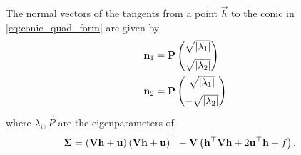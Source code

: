 \begin{theorem}
	The normal vectors of the tangents from 
	a point $\vec{h}$ to the conic in \eqref{eq:conic_quad_form}
	are given by 
  \begin{align} 
  \label{eq:quad_form_pair_normvecs-sigma}
  \begin{split}
  \mathbf{n}_1 &= \mathbf{P}\begin{pmatrix}\sqrt{\left\vert\lambda_1\right\vert} \\[2mm]  \sqrt{\left\vert\lambda_2\right\vert}\end{pmatrix}
  \\
  \mathbf{n}_2 &= \mathbf{P}\begin{pmatrix}\sqrt{\left\vert\lambda_1\right\vert} \\[2mm] - \sqrt{\left\vert\lambda_2\right\vert}\end{pmatrix}
  \end{split}
  \end{align} 
  where $\lambda_i, \vec{P}$ are the eigenparameters of 
  \begin{align} 
		\bm{\Sigma} &= 
	   \left(\mathbf{V}\mathbf{h}+\mathbf{u}\right)
	  \left(\mathbf{V}\mathbf{h}+\mathbf{u}\right)^{\top}
   -\mathbf{V}
  \left(
  \mathbf{h}^{\top}\mathbf{V}\mathbf{h} + 2\mathbf{u}^{\top}\mathbf{h} +f
  \right).
	  \label{eq:h-tangents-sigma}
  \end{align}                    
\end{theorem}
